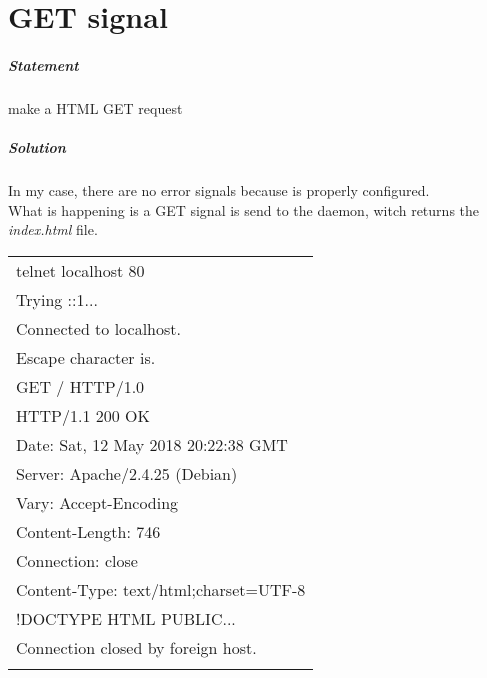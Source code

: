 \documentclass[a4paper,10pt]{article}
\begin{document}
\section{GET signal}
\subparagraph{Statement}
make a HTML GET request
\subparagraph{Solution}
In my case, there are no error signals because is properly configured.\vspace{0.5cm}\\
What is happening is a GET signal is send to the daemon, witch returns the {\it index.html} file.
\vspace{0.5cm}\\\begin{tabular}{|l|}\hline
telnet localhost 80\\
Trying ::1...\\
Connected to localhost.\\
Escape character is.\\
GET / HTTP/1.0\\
HTTP/1.1 200 OK\\
Date: Sat, 12 May 2018 20:22:38 GMT\\
Server: Apache/2.4.25 (Debian)\\
Vary: Accept-Encoding\\
Content-Length: 746\\
Connection: close\\
Content-Type: text/html;charset=UTF-8\\
!DOCTYPE HTML PUBLIC...\\
Connection closed by foreign host.\\
\\\hline\end{tabular}\vspace{0.5cm}\\
\pagebreak
\end{document}
